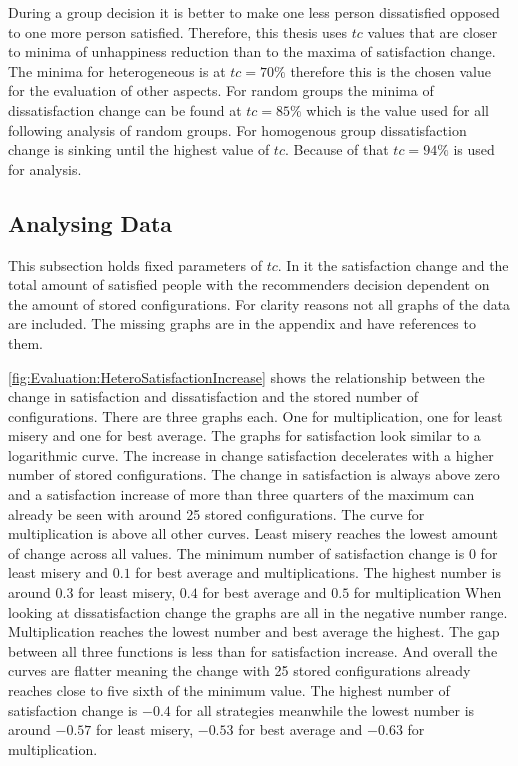 During a group decision it is better to make one less person dissatisfied opposed to one more person satisfied. Therefore, this thesis uses $tc$ values that are closer to minima of unhappiness reduction than to the maxima of satisfaction change. The minima for heterogeneous is at $tc = 70\%$ therefore this is the chosen value for the evaluation of other aspects. For random groups the minima of dissatisfaction change can be found at $tc = 85\%$ which is the value used for all following analysis of random groups. For homogenous group dissatisfaction change is sinking until the highest value of $tc$. Because of that $tc = 94\%$ is used for analysis.

\subsection{Analysing Data}

This subsection holds fixed parameters of $tc$. In it the satisfaction change and the total amount of satisfied people with the recommenders decision dependent on the amount of stored configurations. For clarity reasons not all graphs of the data are included. The missing graphs are in the appendix and have references to them.

\autoref{fig:Evaluation:HeteroSatisfactionIncrease} shows the relationship between the change in satisfaction and dissatisfaction and the stored number of configurations. There are three graphs each. One for multiplication, one for least misery and one for best average. The graphs for satisfaction look similar to a logarithmic curve. The increase in change satisfaction decelerates with a higher number of stored configurations. The change in satisfaction is always above zero and a satisfaction increase of more than three quarters of the maximum can already be seen with around 25 stored configurations. The curve for multiplication is above all other curves. Least misery reaches the lowest amount of change across all values. The minimum number of satisfaction change is $0$ for least misery and $0.1$ for best average and multiplications. The highest number is around $0.3$ for least misery, $0.4$ for best average and $0.5$ for multiplication
When looking at dissatisfaction change the graphs are all in the negative number range. Multiplication reaches the lowest number and best average the highest. The gap between all three functions is less than for satisfaction increase. And overall the curves are flatter meaning the change with 25 stored configurations already reaches close to five sixth of the minimum value. The highest number of satisfaction change is $-0.4$ for all strategies meanwhile the lowest number is around $-0.57$ for least misery, $-0.53$ for best average and $-0.63$ for multiplication.

